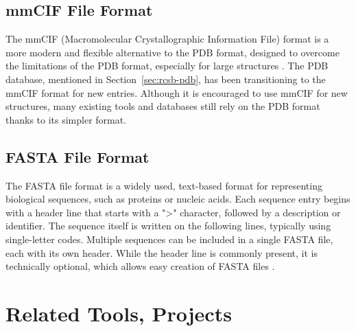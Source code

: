 \begin{figure}[H]
    \centering
    
\end{figure}


\subsection{mmCIF File Format}
\label{sec:mmcif-format}

The mmCIF (Macromolecular Crystallographic Information File) format is a more modern and flexible alternative to the PDB format, designed to overcome the limitations of the PDB format, especially for large structures \cite{bourne199730}. The PDB database, mentioned in Section~\ref{sec:rcsb-pdb}, has been transitioning to the mmCIF format for new entries. Although it is encouraged to use mmCIF for new structures, many existing tools and databases still rely on the PDB format thanks to its simpler format.

\subsection{FASTA File Format}
\label{sec:fasta-format}

The FASTA file format is a widely used, text-based format for representing biological sequences, such as proteins or nucleic acids. Each sequence entry begins with a header line that starts with a ">" character, followed by a description or identifier. The sequence itself is written on the following lines, typically using single-letter codes. Multiple sequences can be included in a single FASTA file, each with its own header. While the header line is commonly present, it is technically optional, which allows easy creation of FASTA files \cite{lipman1985rapid}.

\begin{figure}[H]
    \centering
    
\end{figure}

\section{Related Tools, Projects}
\label{sec:related-tools}

